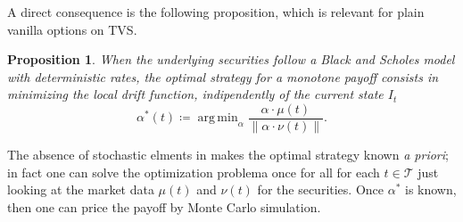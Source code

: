 \documentclass[11pt]{article}
\newtheorem{proposition}[theorem]{Proposition}
\DeclareMathOperator*{\argmin}{arg\,min}
\begin{document}
A direct consequence is the following proposition, which is relevant for plain vanilla options on TVS.

\begin{proposition}
When the underlying securities follow a Black and Scholes model with deterministic rates, the optimal strategy for a monotone payoff consists in minimizing the local drift function, indipendently of the current state $I_t$
\begin{equation}
    \alpha^*(t) \coloneqq \argmin_\alpha \frac{\alpha \cdot \mu(t)}{\|\alpha \cdot \nu(t) \|}.
\label{eq:BS_optimal_strategy}\end{equation}
\end{proposition}
The absence of stochastic elments in  makes the optimal strategy known \textit{a priori}; in fact one can solve the optimization problema once for all for each $t \in \mathcal{T}$ just looking at the market data $\mu(t)$ and $\nu(t)$ for the securities. Once $\alpha^*$ is known, then one can price the payoff by Monte Carlo simulation. 
\end{document}
